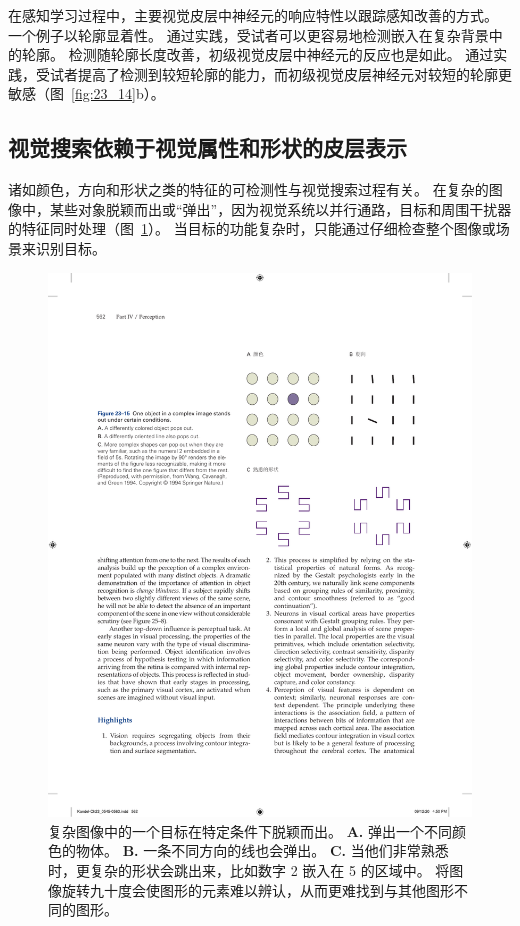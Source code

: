 在感知学习过程中，主要视觉皮层中神经元的响应特性以跟踪感知改善的方式。
一个例子以轮廓显着性。
通过实践，受试者可以更容易地检测嵌入在复杂背景中的轮廓。
检测随轮廓长度改善，初级视觉皮层中神经元的反应也是如此。
通过实践，受试者提高了检测到较短轮廓的能力，而初级视觉皮层神经元对较短的轮廓更敏感（图~\ref{fig:23_14}b）。



\subsection{视觉搜索依赖于视觉属性和形状的皮层表示}

诸如颜色，方向和形状之类的特征的可检测性与视觉搜索过程有关。
在复杂的图像中，某些对象脱颖而出或“弹出”，因为视觉系统以并行通路，目标和周围干扰器的特征同时处理（图~\ref{fig:23_15}）。
当目标的功能复杂时，只能通过仔细检查整个图像或场景来识别目标。


\begin{figure}[htbp]
	\centering
	\includegraphics[width=0.7\linewidth]{chap23/fig_23_15}
	\caption{复杂图像中的一个目标在特定条件下脱颖而出。
		\textbf{A.} 弹出一个不同颜色的物体。
		\textbf{B.} 一条不同方向的线也会弹出。
		\textbf{C.} 当他们非常熟悉时，更复杂的形状会跳出来，比如数字 2 嵌入在 5 的区域中。
		将图像旋转九十度会使图形的元素难以辨认，从而更难找到与其他图形不同的图形\cite{wang1994familiarity}。}
	\label{fig:23_15}
\end{figure}


